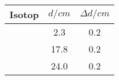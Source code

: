 \begin{tabular}{lSS}
\toprule
Isotop & {$d / \si{cm}$} & {$\Delta d / \si{cm}$} \\ \midrule
{} & 2.3 & 0.2 \\
 & 17.8 & 0.2 \\
 & 24.0 & 0.2 \\ \bottomrule
\end{tabular}